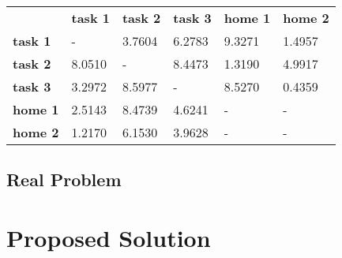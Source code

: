 \documentclass[a4paper]{article}
\begin{document}
\begin{center}
\begin{tabular}{llllll}
                & \textbf{task 1} & \textbf{task 2} & \textbf{task 3} & \textbf{home 1} & \textbf{home 2} \\
\textbf{task 1} &   -             & 3.7604          & 6.2783          & 9.3271          & 1.4957 \\
\textbf{task 2} & 8.0510          &   -             & 8.4473          & 1.3190          & 4.9917 \\
\textbf{task 3} & 3.2972          & 8.5977          &   -             & 8.5270          & 0.4359 \\
\textbf{home 1} & 2.5143          & 8.4739          & 4.6241          &    -            &    -   \\
\textbf{home 2} & 1.2170          & 6.1530          & 3.9628          &    -            &    -
\end{tabular}
\end{center}

\subsection{Real Problem}



\section{Proposed Solution}




\end{document}
